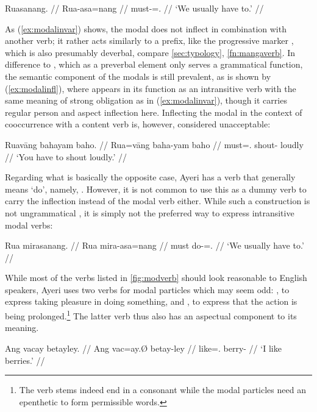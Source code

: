 \a\label{ex:modalinfl}\begingl
	\gla Ruasanang. //
	\glb Rua-asa=nang //
	\glc must-\Hab{}=\Fpl{}.\Aarg{} //
	\glft `We usually have to.' //
\endgl

\xe

As (\ref{ex:modalinvar}) shows, the modal does not inflect in combination with 
another verb; it rather acts similarly to a prefix, like the progressive marker 
, which is also presumably deverbal, compare 
\autoref{sec:typology}, \autoref{fn:mangaverb}. In difference to 
, which as a preverbal element only serves a grammatical 
function, the semantic component of the modals is still prevalent, as is shown 
by (\ref{ex:modalinfl}), where  appears in its function as 
an intransitive verb with the same meaning of strong obligation as in 
(\ref{ex:modalinvar}), though it carries regular person and aspect inflection 
here. Inflecting the modal in the context of cooccurrence with a content verb 
is, however, considered unacceptable:

\ex\ljudge*\begingl
	\gla Ruavāng bahayam baho. //
	\glb Rua=vāng baha-yam baho //
	\glc must=\Ssg{}.\AgtT{} shout-\Ptcp{} loudly //
	\glft `You have to shout loudly.' //
\endgl\xe

Regarding what is basically the opposite case, Ayeri has a verb that generally 
means `do', namely, . However, it is not common to use this 
as a dummy verb to carry the inflection instead of the modal verb either. While 
such a construction is not ungrammatical , it is simply not the 
preferred way to express intransitive modal verbs:

\ex\ljudge\ques\begingl
	\gla Rua mirasanang. //
	\glb Rua mira-asa=nang //
	\glc must do-\Hab{}=\Fpl{}.\Aarg{} //
	\glft `We usually have to.' //
\endgl\xe

While most of the verbs listed in \autoref{fig:modverb} should look 
reasonable to English speakers, Ayeri uses two verbs for modal particles which 
may seem odd: , to express taking pleasure in doing 
something, and , to express that the action is 
being prolonged.\footnote{The verb stems indeed end in a consonant while the 
modal particles need an epenthetic  to form permissible words.} The 
latter verb thus also has an aspectual component to its meaning.

\pex\label{ex:vacvaca}
\a\label{ex:vacfull}\begingl
	\gla Ang vacay betayley. //
	\glb Ang vac=ay.Ø betay-ley //
	\glc \AgtT{} like=\Fsg{}.\Top{} berry-\PargI{} //
	\glft `I like berries.' //
\endgl

